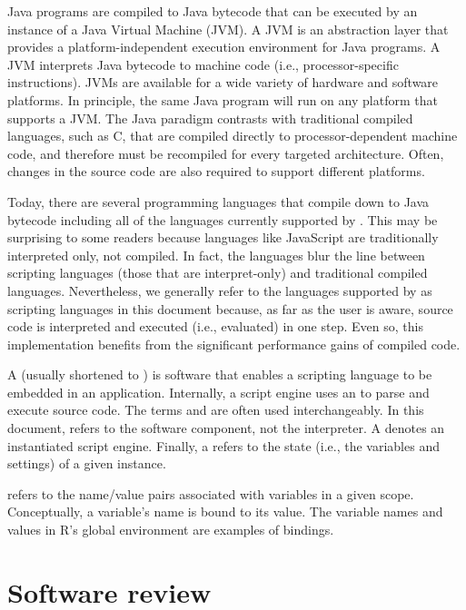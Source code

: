 Java programs are compiled to Java bytecode that can be executed by an instance of a Java Virtual Machine (JVM). A JVM is an abstraction layer that provides a platform-independent execution environment for Java programs. A JVM interprets Java bytecode to machine code (i.e., processor-specific instructions). JVMs are available for a wide variety of hardware and software platforms. In principle, the same Java program will run on any platform that supports a JVM. The Java paradigm contrasts with traditional compiled languages, such as C, that are compiled directly to processor-dependent machine code, and therefore must be recompiled for every targeted architecture. Often, changes in the source code are also required to support different platforms.

Today, there are several programming languages that compile down to Java bytecode including all of the languages currently supported by . This may be surprising to some readers because languages like JavaScript are traditionally interpreted only, not compiled. In fact, the  languages blur the line between scripting languages (those that are interpret-only) and traditional compiled languages. Nevertheless, we generally refer to the languages supported by  as scripting languages in this document because, as far as the user is aware, source code is interpreted and executed (i.e., evaluated) in one step. Even so, this implementation benefits from the significant performance gains of compiled code.

A  (usually shortened to ) is software that enables a scripting language to be embedded in an application. Internally, a script engine uses an  to parse and execute source code. The terms  and  are often used interchangeably. In this document,  refers to the software component, not the interpreter. A  denotes an instantiated script engine. Finally, a  refers to the state (i.e., the variables and settings) of a given instance.

 refers to the name/value pairs associated with variables in a given scope. Conceptually, a variable's name is bound to its value. The variable names and values in R's global environment are examples of bindings.

\hypertarget{softwarereview}{\section{Software review}}

